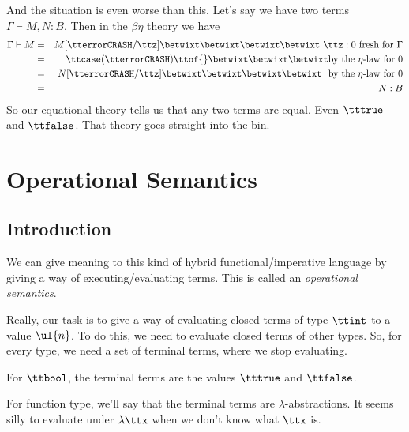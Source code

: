 \documentclass[runningheads,12pt]{llncs}
\begin{document}
And the situation is even worse than this.  Let's say we have two terms $\Gamma \vdash M, N : B$.    Then in the $\beta\eta$ theory we have
\begin{eqnarray*}
  \Gamma \vdash M & = & M[\tterror \mathtt{CRASH}/\ttz] \betwixt \betwixt \betwixt\betwixt \mbox{ $\ttz: 0$ fresh for $\Gamma$}  \\
 & = & \ttcase (\tterror \mathtt{CRASH}) \ttof \{\} \betwixt\betwixt \betwixt\mbox{by the $\eta$-law for 0} \\
& = & N[\tterror \mathtt{CRASH}/\ttz]  \betwixt\betwixt \betwixt \betwixt\ \mbox{  by the $\eta$-law for 0} \\
 & = & N : B
\end{eqnarray*}
So our equational theory tells us that any two terms are equal.  Even $\tttrue$ and $\ttfalse$.  That theory goes straight into the bin.

\section{Operational Semantics}
\subsection{Introduction}

We can give meaning to this kind of hybrid functional/imperative language by giving a way of executing/evaluating terms.  This is called an \emph{operational semantics}.

Really, our task is to give a way of evaluating closed terms of type $\ttint$ to a value $\ul{n}$.   To do this, we need to evaluate closed terms of other types.  So, for every type, we need a set of terminal terms, where we stop evaluating.  

For $\ttbool$, the terminal terms are the values $\tttrue$ and $\ttfalse$.

For function type, we'll say that the terminal terms are $\lambda$-abstractions.  It seems silly to evaluate under $\lambda\ttx$ when we don't know what $\ttx$ is.
\end{document}
